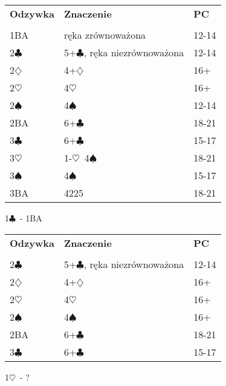 \documentclass{article}
\renewcommand{\c}{\(\clubsuit\)}
\renewcommand{\d}{\(\diamondsuit\)}
\newcommand{\h}{\(\heartsuit\)}
\newcommand{\s}{\(\spadesuit\)}
\begin{document}
\begin{tabular}{p{2cm} p{10cm} l}
	\textbf{Odzywka} & \textbf{Znaczenie} & \textbf{PC}\\\\
	1BA & ręka zrównoważona & 12-14 \\
	2\c & 5+\c, ręka niezrównoważona & 12-14 \\
	2\d & 4+\d & 16+ \\
	2\h & 4\h & 16+ \\
	2\s & 4\s & 12-14 \\
	2BA & 6+\c & 18-21 \\
	3\c & 6+\c & 15-17 \\
	3\h & 1-\h\ 4\s & 18-21 \\
	3\s & 4\s & 15-17 \\
	3BA & 4225 & 18-21 
\end{tabular}
\begin{center}\LARGE{1\c\ - 1BA}
\end{center}

\begin{tabular}{p{2cm} p{10cm} l}
	\textbf{Odzywka} & \textbf{Znaczenie} & \textbf{PC}\\\\
	2\c & 5+\c, ręka niezrównoważona & 12-14 \\
	2\d & 4+\d & 16+ \\
	2\h & 4\h & 16+ \\
	2\s & 4\s & 16+ \\
	2BA & 6+\c & 18-21 \\
	3\c & 6+\c & 15-17 \\
\end{tabular}

\newpage
\begin{center}\LARGE{1\h\ - ?}
\end{center}
\end{document}

